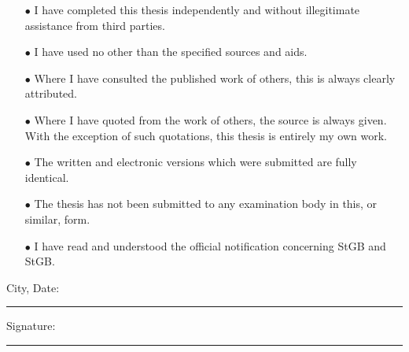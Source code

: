 \begin{itemize}
\item[$\bullet$] I have completed this thesis independently and without illegitimate assistance from third parties.
\item[$\bullet$] I have used no other than the specified sources and aids.
\item[$\bullet$] Where I have consulted the published work of others, this is always clearly attributed.
\item[$\bullet$] Where I have quoted from the work of others, the source is always given. With the exception of such quotations, this thesis is entirely my own work.
\item[$\bullet$] The written and electronic versions which were submitted are fully identical.
\item[$\bullet$] The thesis has not been submitted to any examination body in this, or similar, form.
\item[$\bullet$] I have read and understood the official notification concerning  StGB and  StGB.\\
\end{itemize}
 \vspace{1cm}
\noindent City, Date:\\
\rule[0.5em]{25em}{0.5pt} %
\vfill
\noindent Signature:\\
\rule[0.5em]{25em}{0.5pt} %

\vfill
\cleardoublepage

\tableofcontents